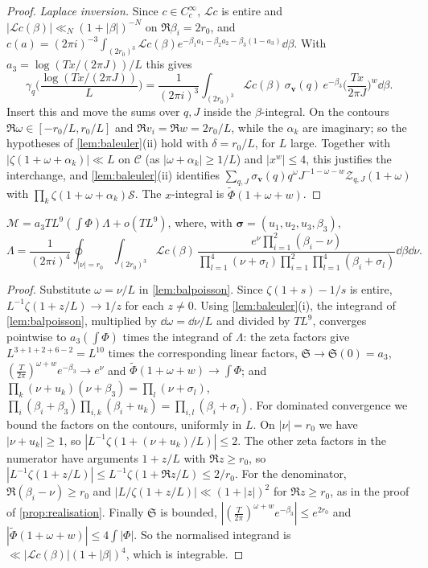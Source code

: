 \documentclass[11pt,colorlinks]{charlie}
\begin{document}
\begin{proof}
\emph{Laplace inversion.} Since $c\in C_c^\infty$, $\mathcal Lc$ is entire and $|\mathcal Lc(\beta)|\ll_N(1+|\beta|)^{-N}$ on $\Re\beta_i=2r_0$, and $c(a)=(2\pi i)^{-3}\int_{(2r_0)^3}\mathcal Lc(\beta)e^{-\beta_1a_1-\beta_2a_2-\beta_3(1-a_3)}\dd\beta$. With $a_3=\log(Tx/(2\pi J))/L$ this gives
\[
 \gamma_q\Big(\frac{\log(Tx/(2\pi J))}L\Big)=\frac1{(2\pi i)^3}\int_{(2r_0)^3}\mathcal Lc(\beta)\,\sigma_{\boldsymbol v}(q)\,e^{-\beta_3}\Big(\frac{Tx}{2\pi J}\Big)^{w}\dd\beta .
\]
Insert this and move the sums over $q,J$ inside the $\beta$-integral. On the contours $\Re\omega\in[-r_0/L,r_0/L]$ and $\Re v_i=\Re w=2r_0/L$, while the $\alpha_k$ are imaginary; so the hypotheses of \cref{lem:baleuler}(ii) hold with $\delta=r_0/L$, for $L$ large. Together with $|\zeta(1+\omega+\alpha_k)|\ll L$ on $\mathcal C$ (as $|\omega+\alpha_k|\ge1/L$) and $|x^w|\le4$, this justifies the interchange, and \cref{lem:baleuler}(ii) identifies $\sum_{q,J}\sigma_{\boldsymbol v}(q)q^\omega J^{-1-\omega-w}\mathcal Z_{q,J}(1+\omega)$ with $\prod_k\zeta(1+\omega+\alpha_k)\mathcal S$. The $x$-integral is $\widetilde\Phi(1+\omega+w)$.
\end{proof}

\begin{lemma}[Limit]\label{lem:ballimit}
$\mathcal M=a_3TL^9(\int\Phi)\Lambda+o(TL^9)$, where, with $\boldsymbol\sigma=(u_1,u_2,u_3,\beta_3)$,
\[
 \Lambda=\frac1{(2\pi i)^4}\oint_{|\nu|=r_0}\int_{(2r_0)^3}\mathcal Lc(\beta)\,\frac{e^\nu\prod_{i=1}^2(\beta_i-\nu)}{\prod_{l=1}^4(\nu+\sigma_l)\prod_{i=1}^2\prod_{l=1}^4(\beta_i+\sigma_l)}\dd\beta\dd\nu .
\]
\end{lemma}
\begin{proof}
Substitute $\omega=\nu/L$ in \cref{lem:balpoisson}. Since $\zeta(1+s)-1/s$ is entire, $L^{-1}\zeta(1+z/L)\to1/z$ for each $z\ne0$. Using \cref{lem:baleuler}(i), the integrand of \cref{lem:balpoisson}, multiplied by $\dd\omega=\dd\nu/L$ and divided by $TL^9$, converges pointwise to $a_3(\int\Phi)$ times the integrand of $\Lambda$: the zeta factors give $L^{3+1+2+6-2}=L^{10}$ times the corresponding linear factors, $\mathfrak S\to\mathfrak S(0)=a_3$, $(\frac T{2\pi})^{\omega+w}e^{-\beta_3}\to e^\nu$ and $\widetilde\Phi(1+\omega+w)\to\int\Phi$; and $\prod_k(\nu+u_k)(\nu+\beta_3)=\prod_l(\nu+\sigma_l)$, $\prod_i(\beta_i+\beta_3)\prod_{i,k}(\beta_i+u_k)=\prod_{i,l}(\beta_i+\sigma_l)$. For dominated convergence we bound the factors on the contours, uniformly in $L$. On $|\nu|=r_0$ we have $|\nu+u_k|\ge1$, so $|L^{-1}\zeta(1+(\nu+u_k)/L)|\le2$. The other zeta factors in the numerator have arguments $1+z/L$ with $\Re z\ge r_0$, so $|L^{-1}\zeta(1+z/L)|\le L^{-1}\zeta(1+\Re z/L)\le2/r_0$. For the denominator, $\Re(\beta_i-\nu)\ge r_0$ and $|L/\zeta(1+z/L)|\ll(1+|z|)^2$ for $\Re z\ge r_0$, as in the proof of \cref{prop:realisation}. Finally $\mathfrak S$ is bounded, $|(\frac T{2\pi})^{\omega+w}e^{-\beta_3}|\le e^{2r_0}$ and $|\widetilde\Phi(1+\omega+w)|\le4\int|\Phi|$. So the normalised integrand is $\ll|\mathcal Lc(\beta)|(1+|\beta|)^4$, which is integrable.
\end{proof}
\end{document}
